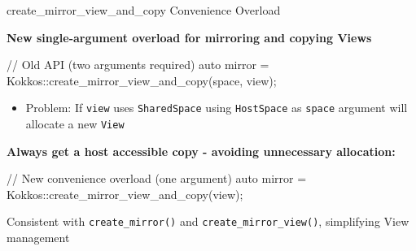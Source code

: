 
\begin{frame}[fragile]{create\_mirror\_view\_and\_copy Convenience Overload}

  \textbf{New single-argument overload for mirroring and copying Views}

  \vspace{15pt}

  \begin{code}[keywords={auto,create_mirror_view_and_copy}]
    // Old API (two arguments required)
    auto mirror = Kokkos::create_mirror_view_and_copy(space, view);
  \end{code}

  \begin{itemize}
    \item Problem: If \texttt{view} uses \texttt{SharedSpace} using \texttt{HostSpace} as \texttt{space} argument will allocate a new \texttt{View}
  \end{itemize}

\textbf{Always get a host accessible copy - avoiding unnecessary allocation:}
  \begin{code}[keywords={auto,create_mirror_view_and_copy}]
    // New convenience overload (one argument)
    auto mirror = Kokkos::create_mirror_view_and_copy(view);
  \end{code}

  \vspace{15pt}

  \small Consistent with \texttt{create\_mirror()} and \texttt{create\_mirror\_view()}, simplifying View management

\end{frame}





